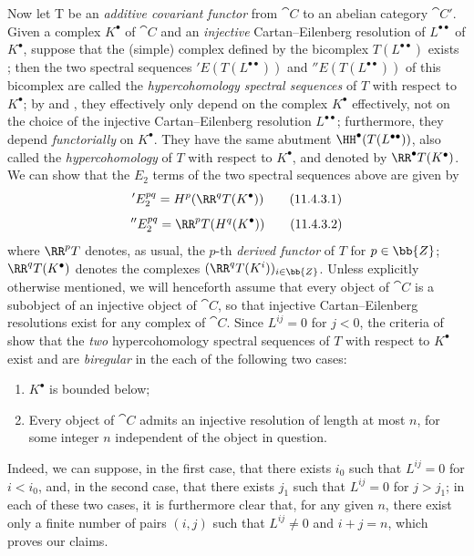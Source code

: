 \begin{env}[11.4.3]
\label{0.11.4.3}
Now let T be an \emph{additive covariant functor} from $\cat{C}$ to an abelian category $\cat{C'}$.
Given a complex $K^\bullet$ of $\cat{C}$ and an \emph{injective} Cartan--Eilenberg resolution of $L^{\bullet\bullet}$ of $K^{\bullet}$, suppose that the (simple) complex defined by the bicomplex $T(L^{\bullet\bullet})$ exists ;
then the two spectral sequences $'E(T(L^{\bullet\bullet}))$ and $''E(T(L^{\bullet\bullet}))$ of this bicomplex are called the \emph{hypercohomology spectral sequences} of $T$ with respect to $K^\bullet$;
by  and , they effectively only depend on the complex $K^\bullet$ effectively, not on the choice of the injective Cartan--Eilenberg resolution $L^{\bullet\bullet}$;
furthermore, they depend \emph{functorially} on $K^\bullet$.
They have the same abutment $\HH^\bullet(T(L^{\bullet\bullet}))$, also called the \emph{hypercohomology} of $T$ with respect to $K^\bullet$, and denoted by $\RR^\bullet T(K^\bullet)$.
We can show that the $E_2$ terms of the two spectral sequences above are given by 
\[
\label{0.11.4.3.1}
  'E_2^{pq}
  = H^p(\RR^q T(K^\bullet))
\tag{11.4.3.1}
\]
\[
\label{0.11.4.3.2}
  ''E_2^{pq}
  = \RR^p T(H^q(K^\bullet))
\tag{11.4.3.2}
\]
where $\RR^p T$ denotes, as usual, the $p$-th \emph{derived functor} of $T$ for $p\in\bb{Z}$;
$\RR^q T(K^\bullet)$ denotes the complexes $(\RR^q T(K^i))_{i\in\bb{Z}}$.
\label{0.11.4.4}
Unless explicitly otherwise mentioned, we will henceforth assume that every object of $\cat{C}$ is a subobject of an injective object of $\cat{C}$, so that injective Cartan--Eilenberg resolutions exist for any complex of $\cat{C}$.
Since $L^{ij}=0$ for $j<0$, the criteria of  show that the \emph{two} hypercohomology spectral sequences of $T$ with respect to $K^\bullet$ exist and are \emph{biregular} in the each of the following two cases:
\begin{enumerate}
  \item $K^\bullet$ is bounded below;
  \item Every object of $\cat{C}$ admits an injective resolution of length at most $n$, for some integer $n$ independent of the object in question.
\end{enumerate}
Indeed, we can suppose, in the first case, that  there exists $i_0$ such that $L^{ij}=0$ for $i<i_0$, and, in the second case, that there exists $j_1$ such that $L^{ij}=0$ for $j>j_1$;
in each of these two cases, it is furthermore clear that, for any given $n$, there exist only a finite number of pairs $(i,j)$ such that $L^{ij}\neq 0$ and $i+j=n$, which proves our claims.


\end{env}
